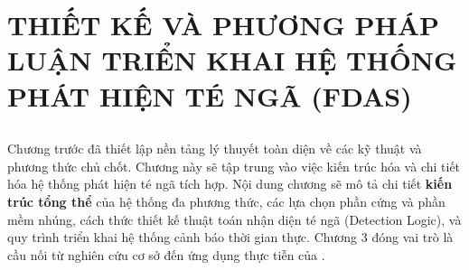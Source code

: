 
\chapter[THIẾT KẾ VÀ THỰC HIỆN]{THIẾT KẾ VÀ PHƯƠNG PHÁP LUẬN TRIỂN KHAI HỆ THỐNG PHÁT HIỆN TÉ NGÃ (FDAS)}
\label{chap:methodology} %

\section*{} %
Chương trước đã thiết lập nền tảng lý thuyết toàn diện về các kỹ thuật và phương thức chủ chốt. Chương này sẽ tập trung vào việc kiến trúc hóa và chi tiết hóa hệ thống phát hiện té ngã tích hợp. Nội dung chương sẽ mô tả chi tiết \textbf{kiến trúc tổng thể} của hệ thống đa phương thức, các lựa chọn phần cứng và phần mềm nhúng, cách thức thiết kế thuật toán nhận diện té ngã (Detection Logic), và quy trình triển khai hệ thống cảnh báo thời gian thực. Chương 3 đóng vai trò là cầu nối từ nghiên cứu cơ sở đến ứng dụng thực tiễn của \TENLUANVAN.




